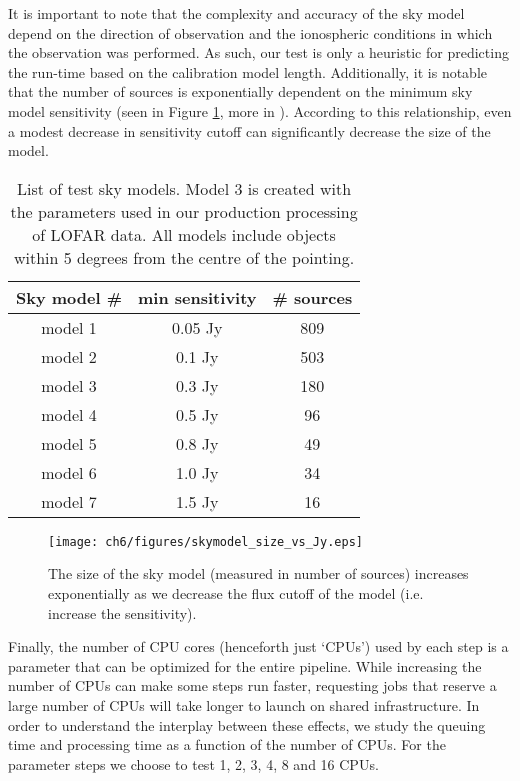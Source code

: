 It is important to note that the complexity and accuracy of the sky model depend on the direction of observation and the ionospheric conditions in which the observation was performed. As such, our test is only a heuristic for predicting the run-time based on the calibration model length. Additionally, it is notable that the number of sources is exponentially dependent on the minimum sky model sensitivity (seen in Figure \ref{fig:ch6_skymodel_size}, more in \citealt{tgssadr,Wendy_bootes}). According to this relationship, even a modest decrease in sensitivity cutoff can significantly decrease the size of the model.

\begin{table}[!ht]
\centering
\begin{tabular}{||c| c | c||} 
 \hline
 Sky model \# & min sensitivity & \# sources  \\ [0.5ex] 
 \hline
 model 1 & 0.05 Jy & 809    \\ 
 model 2 & 0.1 Jy & 503   \\
 \rowcolor{Gray}
  \hline
 model 3 & 0.3 Jy & 180   \\
  \hline
 model 4 & 0.5 Jy & 96  \\
 model 5 & 0.8 Jy & 49   \\ 
 model 6 & 1.0 Jy & 34   \\
 model 7 & 1.5 Jy & 16   \\[1ex] 
 \hline
\end{tabular}
\caption{List of test sky models. Model 3 is created with the parameters used in our production processing of LOFAR data. All models include objects within 5 degrees from the centre of the pointing.  }
\label{table:skymodels}
\end{table}


\begin{figure}
    \texttt{[image: ch6/figures/skymodel\_size\_vs\_Jy.eps]}
      \caption{The size of the sky model (measured in number of sources) increases exponentially as we decrease the flux cutoff of the model (i.e. increase the sensitivity).}
	\label{fig:ch6_skymodel_size}
\end{figure}


Finally, the number of CPU cores (henceforth just `CPUs') used by each step is a parameter that can be optimized for the entire pipeline. While increasing the number of CPUs can make some steps run faster, requesting jobs that reserve a large number of CPUs will take longer to launch on shared infrastructure. In order to understand the interplay between these effects, we study the queuing time and processing time as a function of the number of CPUs. For the parameter steps we choose to test 1, 2, 3, 4, 8 and 16 CPUs. 


